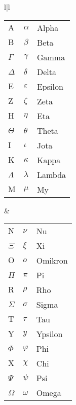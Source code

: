\documentclass[a4paper,10pt,fleqn,twocolumn,twoside,openany]{book}
\numberwithin{equation}{chapter}
\begin{document}
\begin{tabular}{l|l}
\begin{tabular}[t]{lll}
$\mathrm A$ & $\alpha$   & Alpha\\
$\mathrm B$ & $\beta$    & Beta\\
$\Gamma$    & $\gamma$   & Gamma\\
$\Delta$    & $\delta$   & Delta\\
\noalign{\vspace{1em}}
$\mathrm E$ & $\varepsilon$ & Epsilon\\
$\mathrm Z$ & $\zeta$    & Zeta\\
$\mathrm H$ & $\eta$     & Eta\\
$\Theta$    & $\theta$   & Theta\\
\noalign{\vspace{1em}}
$\mathrm I$ & $\iota$    & Jota\\
$\mathrm K$ & $\kappa$   & Kappa\\
$\Lambda$   & $\lambda$  & Lambda\\
$\mathrm M$ & $\mu$      & My
\end{tabular}
&
\begin{tabular}[t]{lll}
$\mathrm N$ & $\nu$      & Nu\\
$\Xi$       & $\xi$      & Xi\\
$\mathrm O$ & $o$        & Omikron\\
$\Pi$       & $\pi$      & Pi\\
\noalign{\vspace{1em}}
$\mathrm R$ & $\rho$     & Rho\\
$\Sigma$    & $\sigma$   & Sigma\\
$\mathrm T$ & $\tau$     & Tau\\
$\mathrm Y$ & $y$        & Ypsilon\\
\noalign{\vspace{1em}}
$\Phi$      & $\varphi$  & Phi\\
$\mathrm X$ & $\chi$     & Chi\\
$\Psi$      & $\psi$     & Psi\\
$\Omega$    & $\omega$   & Omega 
\end{tabular}
\end{tabular}
\end{document}

